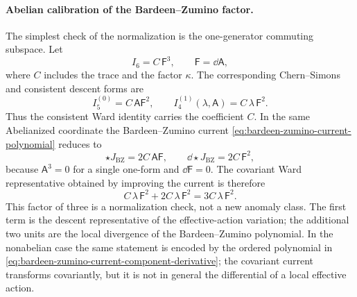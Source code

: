 \paragraph{Abelian calibration of the Bardeen--Zumino factor.}
The simplest check of the normalization is the one-generator commuting
subspace.  Let
\[
  I_6=C\,\mathsf F^3,\qquad \mathsf F=\dd\mathsf A ,
\]
where \(C\) includes the trace and the factor \(\kappa\).  The corresponding
Chern--Simons and consistent descent forms are
\begin{equation}
  I_5^{(0)}=C\,\mathsf A\mathsf F^2,\qquad
  I_4^{(1)}(\lambda,\mathsf A)=C\,\lambda\,\mathsf F^2 .
  \label{eq:abelian-consistent-descent-calibration}
\end{equation}
Thus the consistent Ward identity carries the coefficient \(C\).  In the
same Abelianized coordinate the Bardeen--Zumino current
\eqref{eq:bardeen-zumino-current-polynomial} reduces to
\begin{equation}
  \star J_{\mathrm{BZ}}
  =
  2C\,\mathsf A\mathsf F ,
  \qquad
  \dd\star J_{\mathrm{BZ}}
  =
  2C\,\mathsf F^2 ,
  \label{eq:abelian-bz-divergence-calibration}
\end{equation}
because \(\mathsf A^3=0\) for a single one-form and \(\dd\mathsf F=0\).
The covariant Ward representative obtained by improving the current is
therefore
\begin{equation}
  C\,\lambda\,\mathsf F^2
  +
  2C\,\lambda\,\mathsf F^2
  =
  3C\,\lambda\,\mathsf F^2 .
  \label{eq:abelian-covariant-anomaly-factor-three}
\end{equation}
This factor of three is a normalization check, not a new anomaly class.  The
first term is the descent representative of the effective-action variation;
the additional two units are the local divergence of the Bardeen--Zumino
polynomial.  In the nonabelian case the same statement is encoded by the
ordered polynomial in
\eqref{eq:bardeen-zumino-current-component-derivative}; the covariant current
transforms covariantly, but it is not in general the differential of a local
effective action.

